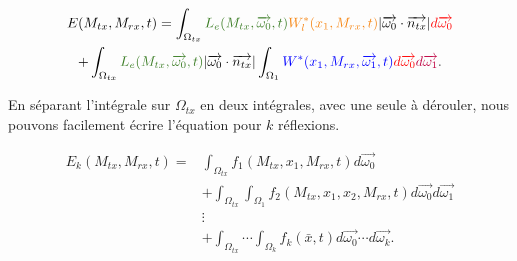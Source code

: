 \large \begin{multline} \label{eq:Eclairement_LTE_potentiel}
    E(M_{tx}, M_{rx}, t) =
        \int_{\Omega_{tx}}
            \textcolor{OliveGreen}{L_e(M_{tx}, \overrightarrow{\omega_0}, t)}
            \textcolor{BurntOrange}{W_l^*(x_1, M_{rx}, t)}
            | \overrightarrow{\omega_0} \cdot \overrightarrow{n_{tx}} |
            \textcolor{red}{d\overrightarrow{\omega_0}}
        \\ +
        \int_{\Omega_{tx}}
            \textcolor{OliveGreen}{L_e(M_{tx}, \overrightarrow{\omega_0}, t)}
            | \overrightarrow{\omega_0} \cdot \overrightarrow{n_{tx}} |
            \int_{\Omega_1}
                \textcolor{blue}{W^*(x_1, M_{rx}, \overrightarrow{\omega_1}, t)}
            \textcolor{red}{d\overrightarrow{\omega_0}}
        \textcolor{purple}{d\overrightarrow{\omega_1}}
.\end{multline} \normalsize

En séparant l'intégrale sur $\Omega_{tx}$ en deux intégrales, avec une seule à dérouler, nous pouvons facilement écrire l'équation pour $k$ réflexions.

\large \begin{equation}
\begin{split}
    E_k(M_{tx}, M_{rx}, t) =
        &\int_{\Omega_{tx}}
            f_1({M_{tx}, x_1, M_{rx}}, t)
        d\overrightarrow{\omega_0}
        \\ &+
        \int_{\Omega_{tx}}
            \int_{\Omega_1}
                f_2({M_{tx}, x_1, x_2,  M_{rx}}, t)
            d\overrightarrow{\omega_0}
        d\overrightarrow{\omega_1}
        \\ &\vdots
        \\ &+
        \int_{\Omega_{tx}}
            \cdots
            \int_{\Omega_k}
                f_k(\bar{x}, t)
            d\overrightarrow{\omega_0}
            \cdots
        d\overrightarrow{\omega_k}
.\end{split}
\end{equation} \normalsize \newline\par

